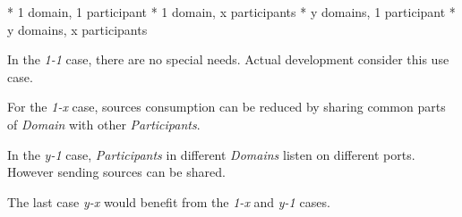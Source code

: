 \begitems
* 1 domain, 1 participant
* 1 domain, x participants
* y domains, 1 participant
* y domains, x participants
\enditems

In the {\em 1-1} case, there are no special needs. Actual development consider this use case.

For the {\em 1-x} case, sources consumption can be reduced by sharing common parts of {\em Domain} with other {\em Participants}.

In the {\em y-1} case, {\em Participants} in different {\em Domains} listen on different ports. However sending sources can be shared.

The last case {\em y-x} would benefit from the {\em 1-x} and {\em y-1} cases.

